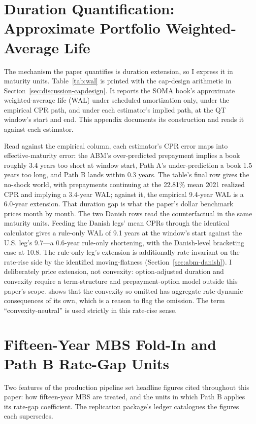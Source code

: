 \documentclass[12pt]{article}
\begin{document}
\section{Duration Quantification: Approximate Portfolio Weighted-Average Life}\label{sec:robustness-wal}

The mechanism the paper quantifies is duration extension, so I express it in maturity units. Table~\ref{tab:wal} is printed with the cap-design arithmetic in Section~\ref{sec:discussion-capdesign}. It reports the SOMA book's approximate weighted-average life (WAL) under scheduled amortization only, under the empirical CPR path, and under each estimator's implied path, at the QT window's start and end. This appendix documents its construction and reads it against each estimator.

Read against the empirical column, each estimator's CPR error maps into effective-maturity error: the ABM's over-predicted prepayment implies a book roughly 3.4 years too short at window start, Path A's under-prediction a book 1.5 years too long, and Path B lands within 0.3 years. The table's final row gives the no-shock world, with prepayments continuing at the 22.81\% mean 2021 realized CPR and implying a 3.4-year WAL; against it, the empirical 9.4-year WAL is a 6.0-year extension. That duration gap is what the paper's dollar benchmark prices month by month. The two Danish rows read the counterfactual in the same maturity units. Feeding the Danish legs' mean CPRs through the identical calculator gives a rule-only WAL of 9.1 years at the window's start against the U.S. leg's 9.7---a 0.6-year rule-only shortening, with the Danish-level bracketing case at 10.8. The rule-only leg's extension is additionally rate-invariant on the rate-rise side by the identified moving-flatness (Section~\ref{sec:abm-danish}). I deliberately price extension, not convexity: option-adjusted duration and convexity require a term-structure and prepayment-option model outside this paper's scope. \citet{hanson2014} shows that the convexity so omitted has aggregate rate-dynamic consequences of its own, which is a reason to flag the omission. The term ``convexity-neutral'' is used strictly in this rate-rise sense.

\section{Fifteen-Year MBS Fold-In and Path B Rate-Gap Units}\label{sec:robustness-pipeline}

Two features of the production pipeline set headline figures cited throughout this paper: how fifteen-year MBS are treated, and the units in which Path B applies its rate-gap coefficient. The replication package's ledger catalogues the figures each supersedes.
\end{document}
